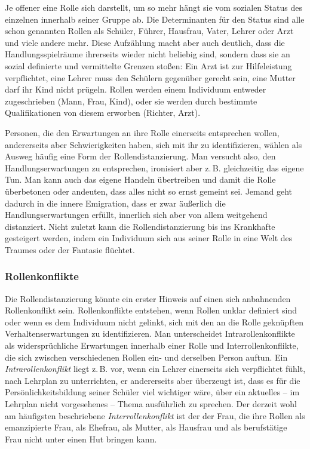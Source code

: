 \documentclass[12pt]{scrartcl}
\DeclareRobustCommand{\zB}{z.\,B.\xspace}
\begin{document}
Je offener eine Rolle sich darstellt, um so mehr hängt sie vom sozialen Status
des einzelnen innerhalb seiner Gruppe ab. Die Determinanten für den Status sind
alle schon genannten Rollen als Schüler, Führer, Hausfrau, Vater, Lehrer oder
Arzt und viele andere mehr. Diese Aufzählung macht aber auch deutlich, dass die
Handlungsspielräume ihrerseits wieder nicht beliebig sind, sondern dass sie an
sozial definierte und vermittelte Grenzen stoßen: Ein Arzt ist zur
Hilfeleistung verpflichtet, eine Lehrer muss den Schülern gegenüber gerecht
sein, eine Mutter darf ihr Kind nicht prügeln. Rollen werden einem Individuum
entweder zugeschrieben (Mann, Frau, Kind), oder sie werden durch bestimmte
Qualifikationen von diesem erworben (Richter, Arzt).

Personen, die den Erwartungen an ihre Rolle einerseits entsprechen wollen,
andererseits aber Schwierigkeiten haben, sich mit ihr zu identifizieren, wählen
als Ausweg häufig eine Form der Rollendistanzierung. Man versucht also, den
Handlungserwartungen zu entsprechen, ironisiert aber \zB gleichzeitig das
eigene Tun. Man kann auch das eigene Handeln übertreiben und damit die Rolle
überbetonen oder andeuten, dass alles nicht so ernst gemeint sei. Jemand geht
dadurch in die innere Emigration, dass er zwar äußerlich die
Handlungserwartungen erfüllt, innerlich sich aber von allem weitgehend
distanziert. Nicht zuletzt kann die Rollendistanzierung bis ins Krankhafte
gesteigert werden, indem ein Individuum sich aus seiner Rolle in eine Welt des
Traumes oder der Fantasie flüchtet.

\subsubsection{Rollenkonflikte}
Die Rollendistanzierung könnte ein erster Hinweis auf einen sich anbahnenden
Rollenkonflikt sein. Rollenkonflikte entstehen, wenn Rollen unklar definiert
sind oder wenn es dem Individuum nicht gelinkt, sich mit den an die Rolle
geknüpften Verhaltenserwartungen zu identifizieren. Man unterscheidet
Intrarollenkonflikte als widersprüchliche Erwartungen innerhalb einer Rolle und
Interrollenkonflikte, die sich zwischen verschiedenen Rollen ein- und derselben
Person auftun. Ein \emph{Intrarollenkonflikt} liegt \zB vor, wenn ein Lehrer
einerseits sich verpflichtet fühlt, nach Lehrplan zu unterrichten, er
andererseits aber überzeugt ist, dass es für die Persönlichkeitsbildung seiner
Schüler viel wichtiger wäre, über ein aktuelles -- im Lehrplan nicht
vorgesehenes -- Thema ausführlich zu sprechen. Der derzeit wohl am häufigsten
beschriebene \emph{Interrollenkonflikt} ist der der Frau, die ihre Rollen als
emanzipierte Frau, als Ehefrau, als Mutter, als Hausfrau und als berufstätige
Frau nicht unter einen Hut bringen kann.
\end{document}

